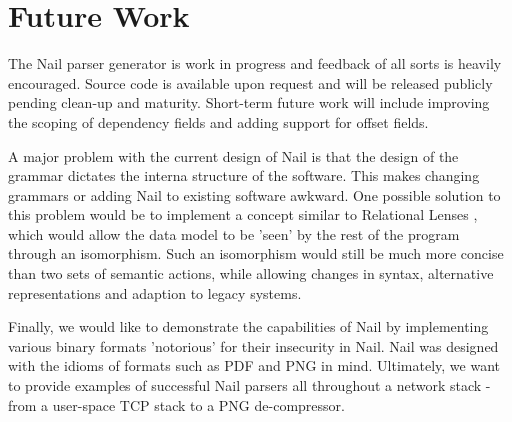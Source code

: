\section{Future Work}

The Nail parser generator is work in progress and feedback of all sorts is heavily
encouraged. Source code is available upon request and will be released publicly pending clean-up and
maturity. Short-term future work will include improving the scoping of dependency fields and adding
support for offset fields.

A major problem with the current design of Nail is that the design of the grammar dictates the
interna structure of the software. This makes changing grammars or adding Nail to existing software
awkward. One possible solution to this problem would be to implement a concept similar to Relational
Lenses \cite{bohannon2006relational}, which would allow  the data model to be 'seen' by
the rest of the program through an isomorphism. Such an isomorphism would still be much more concise
than two sets of semantic actions, while allowing changes in syntax, alternative representations
and adaption to legacy systems.

Finally, we would like to demonstrate the capabilities of Nail by implementing various binary
formats 'notorious' for their insecurity in Nail. Nail was designed with the idioms of formats such
as PDF and PNG in mind. Ultimately, we want to provide examples of successful Nail parsers all
throughout a network stack - from a user-space TCP stack to a PNG de-compressor.

